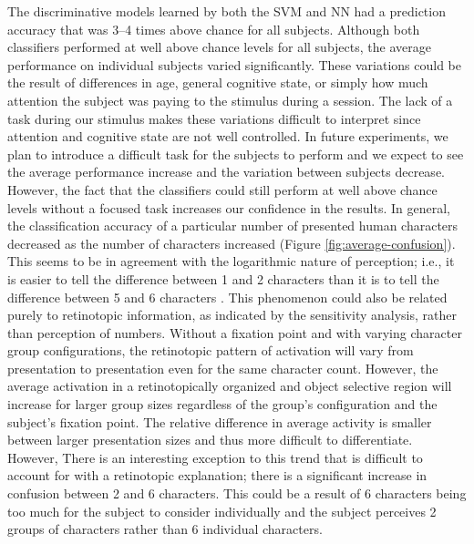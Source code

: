 \documentclass[preprint,5p,authoryear]{elsarticle}
\begin{document}
The discriminative models learned by both the SVM and NN had a prediction accuracy that was 3--4 times above chance for all subjects.
Although both classifiers performed at well above chance levels for all subjects, the average performance on individual subjects varied significantly.
These variations could be the result of differences in age, general cognitive state, or simply how much attention the subject was paying to the stimulus during a session.
The lack of a task during our stimulus makes these variations difficult to interpret since attention and cognitive state are not well controlled.
In future experiments, we plan to introduce a difficult task for the subjects to perform and we expect to see the average performance increase and the variation between subjects decrease.
However, the fact that the classifiers could still perform at well above chance levels without a focused task increases our confidence in the results.
In general, the classification accuracy of a particular number of presented human characters decreased as the number of characters increased (Figure \ref{fig:average-confusion}).
This seems to be in agreement with the logarithmic nature of perception; i.e., it is easier to tell the difference between 1 and 2 characters than it is to tell the difference between 5 and 6 characters \citep{Shepard1975,Dehaene2003}.
This phenomenon could also be related purely to retinotopic information, as indicated by the sensitivity analysis, rather than perception of numbers.
Without a fixation point and with varying character group configurations, the retinotopic pattern of activation will vary from presentation to presentation even for the same character count.
However, the average activation in a retinotopically organized and object selective region will increase for larger group sizes regardless of the group's configuration and the subject's fixation point.
The relative difference in average activity is smaller between larger presentation sizes and thus more difficult to differentiate.
However, There is an interesting exception to this trend that is difficult to account for with a retinotopic explanation; there is a significant increase in confusion between 2 and 6 characters.
This could be a result of 6 characters being too much for the subject to consider individually and the subject perceives 2 groups of characters rather than 6 individual characters.
\end{document}
